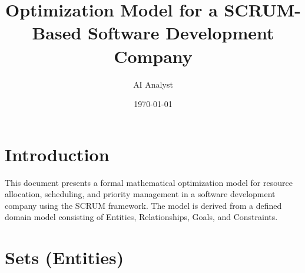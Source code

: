 \documentclass[11pt]{article}
\title{Optimization Model for a SCRUM-Based Software Development Company}
\author{AI Analyst}
\date{\today}
\begin{document}
\maketitle
\tableofcontents
\newpage

\section*{Introduction}
This document presents a formal mathematical optimization model for resource allocation, scheduling, and priority management in a software development company using the SCRUM framework. The model is derived from a defined domain model consisting of Entities, Relationships, Goals, and Constraints.

\section{Sets (Entities)}
\end{document}
